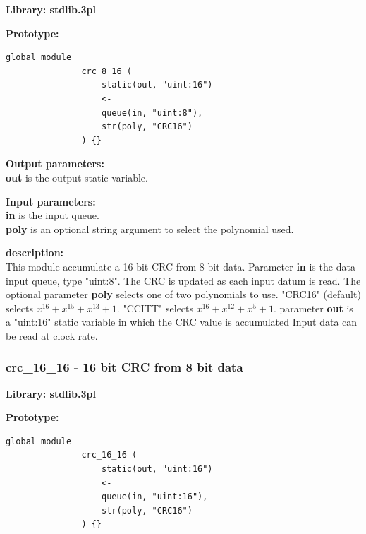             {\bf Library: stdlib.3pl}

            {\bf Prototype:} \\
            \vsp
            \begin{lstlisting}[gobble=12, language=threepl]
               global module
               crc_8_16 (
                   static(out, "uint:16")
                   <-
                   queue(in, "uint:8"),
                   str(poly, "CRC16")
               ) {}
            \end{lstlisting}

            {\bf Output parameters:} \\
            {\bf out} is the output static variable.

            {\bf Input parameters:} \\
            {\bf in} is the input queue.\\
            {\bf poly} is an optional string argument to select the polynomial
            used.

            {\bf description:} \\
            This module accumulate a 16 bit CRC from 8 bit data. Parameter {\bf
            in} is the data input queue, type "uint:8". The CRC is updated as
            each input datum is read. The optional parameter {\bf poly} selects
            one of two polynomials to use. "CRC16" (default) selects $x^{16} +
            x^{15} + x^{13} + 1$. "CCITT" selects $x^{16} + x^{12} + x^5 + 1$. parameter
            {\bf out} is a "uint:16" static variable in which the CRC value is
            accumulated Input data can be read at clock rate.



    
        \subsubsection{crc\_16\_16 - 16 bit CRC from 8 bit data}\label{sec:lmcrc1616}


            {\bf Library: stdlib.3pl}

            {\bf Prototype:} \\
            \vsp
            \begin{lstlisting}[gobble=12, language=threepl]
               global module
               crc_16_16 (
                   static(out, "uint:16")
                   <-
                   queue(in, "uint:16"),
                   str(poly, "CRC16")
               ) {}
            \end{lstlisting}

